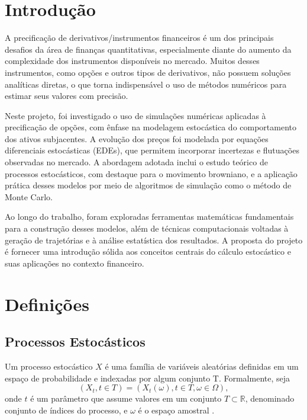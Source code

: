 \documentclass[12pt,openright,oneside,a4paper]{abntex2}
\numberwithin{equation}{section}
\begin{document}
\cleardoublepage


\section{Introdução}

A precificação de derivativos/instrumentos financeiros é um dos principais desafios da área de finanças quantitativas, especialmente diante do aumento da complexidade dos instrumentos disponíveis no mercado. Muitos desses instrumentos, como opções e outros tipos de derivativos, não possuem soluções analíticas diretas, o que torna indispensável o uso de métodos numéricos para estimar seus valores com precisão.

Neste projeto, foi investigado o uso de simulações numéricas aplicadas à precificação de opções, com ênfase na modelagem estocástica do comportamento dos ativos subjacentes. A evolução dos preços foi modelada por equações diferenciais estocásticas (EDEs), que permitem incorporar incertezas e flutuações observadas no mercado. A abordagem adotada inclui o estudo teórico de processos estocásticos, com destaque para o movimento browniano, e a aplicação prática desses modelos por meio de algoritmos de simulação como o método de Monte Carlo.

Ao longo do trabalho, foram exploradas ferramentas matemáticas fundamentais para a construção desses modelos, além de técnicas computacionais voltadas à geração de trajetórias e à análise estatística dos resultados. A proposta do projeto é fornecer uma introdução sólida aos conceitos centrais do cálculo estocástico e suas aplicações no contexto financeiro.
\section{Definições}

\subsection{Processos Estocásticos}


Um processo estocástico $X$ é uma família de variáveis aleatórias definidas em um espaço de probabilidade e indexadas por algum conjunto T. Formalmente, seja
$$
(X_t, t \in T) = (X_t(\omega), t \in T, \omega \in \Omega),
$$
onde $t$ é um parâmetro que assume valores em um conjunto $T \subset \mathbb{R}$, denominado conjunto de índices do processo, e $\omega$ é o espaço amostral \parencite[p.~23]{Mikosh}.
\\
\end{document}
